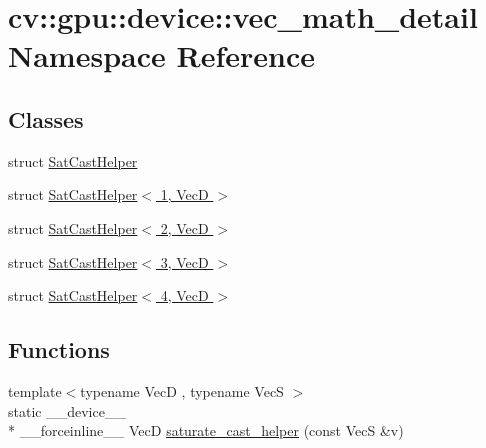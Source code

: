 \hypertarget{namespacecv_1_1gpu_1_1device_1_1vec__math__detail}{\section{cv\-:\-:gpu\-:\-:device\-:\-:vec\-\_\-math\-\_\-detail Namespace Reference}
\label{namespacecv_1_1gpu_1_1device_1_1vec__math__detail}
}
\subsection*{Classes}
\begin{DoxyCompactItemize}
\item 
struct \hyperlink{structcv_1_1gpu_1_1device_1_1vec__math__detail_1_1SatCastHelper}{Sat\-Cast\-Helper}
\item 
struct \hyperlink{structcv_1_1gpu_1_1device_1_1vec__math__detail_1_1SatCastHelper_3_011_00_01VecD_01_4}{Sat\-Cast\-Helper$<$ 1, Vec\-D $>$}
\item 
struct \hyperlink{structcv_1_1gpu_1_1device_1_1vec__math__detail_1_1SatCastHelper_3_012_00_01VecD_01_4}{Sat\-Cast\-Helper$<$ 2, Vec\-D $>$}
\item 
struct \hyperlink{structcv_1_1gpu_1_1device_1_1vec__math__detail_1_1SatCastHelper_3_013_00_01VecD_01_4}{Sat\-Cast\-Helper$<$ 3, Vec\-D $>$}
\item 
struct \hyperlink{structcv_1_1gpu_1_1device_1_1vec__math__detail_1_1SatCastHelper_3_014_00_01VecD_01_4}{Sat\-Cast\-Helper$<$ 4, Vec\-D $>$}
\end{DoxyCompactItemize}
\subsection*{Functions}
\begin{DoxyCompactItemize}
\item 
{\footnotesize template$<$typename Vec\-D , typename Vec\-S $>$ }\\static \-\_\-\-\_\-device\-\_\-\-\_\- \\*
\-\_\-\-\_\-forceinline\-\_\-\-\_\- Vec\-D \hyperlink{namespacecv_1_1gpu_1_1device_1_1vec__math__detail_adbbcb95e294d2ffcc8d5e8e30314edea}{saturate\-\_\-cast\-\_\-helper} (const Vec\-S \&v)
\end{DoxyCompactItemize}


